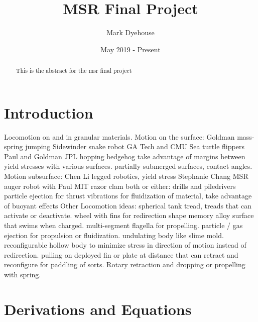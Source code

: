 \documentclass{article}
\title{MSR Final Project}
\author{Mark Dyehouse}
\date{May 2019 - Present}
\begin{document}
\maketitle

\begin{abstract}
    This is the abstract for the msr final project
\end{abstract}

\section{Introduction}
Locomotion on and in granular materials.
\newline
Motion on the surface:
Goldman mass-spring jumping
Sidewinder snake robot GA Tech and CMU
Sea turtle flippers Paul and Goldman
JPL hopping hedgehog
\newline
take advantage of margins between yield stresses with various surfaces. partially submerged surfaces, contact angles.
\newline
Motion subsurface:
Chen Li legged robotics, yield stress
Stephanie Chang MSR auger robot with Paul
MIT razor clam
\newline
both or either:
drills and piledrivers
particle ejection for thrust
vibrations for fluidization of material, take advantage of buoyant effects
\newline
Other Locomotion ideas:
spherical tank tread, treads that can activate or deactivate. wheel with fins for redirection shape memory alloy surface that swims when charged. multi-segment flagella for propelling. particle / gas ejection for propulsion or fluidization. undulating body like slime mold. reconfigurable hollow body to minimize stress in direction of motion instead of redirection. pulling on deployed fin or plate at distance that can retract and reconfigure for paddling of sorts.
\newline
Rotary retraction and dropping or propelling with spring.
\section{Derivations and Equations}
\end{document}
